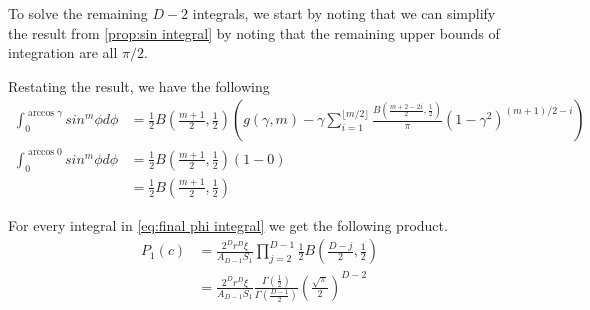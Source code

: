 \documentclass{article}
\begin{document}
To solve the remaining $D-2$ integrals, we start by noting that we can simplify the result from \ref{prop:sin integral}
by noting that the remaining upper bounds of integration are all $\pi/2$. 

Restating the result, we have the following
\begin{align}
	\int_0^{\arccos \gamma}sin^m\phi d\phi &= \frac{1}{2}B\left(\frac{m+1}{2}, \frac{1}{2}\right)\left(g(\gamma, m) - \gamma\sum_{i=1}^{\lfloor m/2 \rfloor}\frac{B(\frac{m+2-2i}{2}, \frac{1}{2})}{\pi}(1-\gamma^2)^{(m+1)/2-i}\right) \\
	\int_0^{\arccos 0}sin^m\phi d\phi &= \frac{1}{2}B\left(\frac{m+1}{2}, \frac{1}{2}\right)(1-0) \\
	&= \frac{1}{2}B\left(\frac{m+1}{2}, \frac{1}{2}\right)
\end{align}

For every integral in \ref{eq:final phi integral} we get the following product.
\begin{align}
	P_1(c) &= \frac{2^D r^D \xi}{A_{D-1} S_1}\prod_{j=2}^{D-1}\frac{1}{2}B\left(\frac{D-j}{2}, \frac{1}{2}\right) \\
	&= \frac{2^D r^D \xi}{A_{D-1} S_1} \frac{\Gamma(\frac{1}{2})}{\Gamma(\frac{D-1}{2})}\left(\frac{\sqrt{\pi}}{2}\right)^{D-2}
\end{align}
\end{document}
